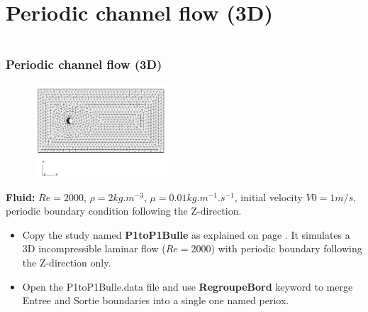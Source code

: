 \documentclass[10pt, hyperref={unicode=true,pdfusetitle, bookmarks=true,bookmarksnumbered=false,bookmarksopen=false, breaklinks=false,pdfborder={0 0 1},backref=true,colorlinks=true,linkcolor=darkblue,pageanchor}]{beamer}
\begin{document}
\section{{\bf{Periodic channel flow (3D)}}}
\begin{frame}
\begin{small}
\begin{columns}[c] 
\tableofcontents[sections={1-9},currentsection, currentsubsection]
\tableofcontents[sections={10-16},currentsection, currentsubsection]
\end{columns}
\end{small}
\end{frame}
\begin{frame}
\frametitle{Periodic channel flow (3D)}
\begin{block}{}

\begin{figure}
\includegraphics[width=0.45\textwidth]{PICTURES/periodic3D.png}
\end{figure}

\textbf{Fluid:} $Re=2000$, $\rho=2 kg.m^{-3}$, $\mu=0.01 kg.m^{-1}.s^{-1}$, initial velocity $V0=1m/s$, periodic boundary condition following the Z-direction.

\begin{itemize}
\item Copy the study named \textbf{P1toP1Bulle} as explained on page \pageref{method_copy}. It simulates a 3D incompressible laminar flow ($Re=2000$) with periodic boundary following the Z-direction only.

\item Open the P1toP1Bulle.data file and use \textbf{RegroupeBord} keyword to merge Entree and Sortie boundaries into a single one named periox. 
\end{itemize}

\end{block}
\end{frame}
\end{document}
